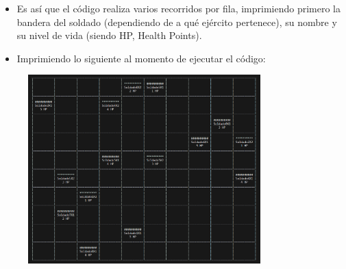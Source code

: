\documentclass{article}
\begin{document}
	\begin{itemize}
		\item Es así que el código realiza varios recorridos por fila, imprimiendo primero la bandera del soldado (dependiendo de a qué ejército pertenece), su nombre y su nivel de vida (siendo HP, Health Points).
		\item Imprimiendo lo siguiente al momento de ejecutar el código:
	\end{itemize}
	
	\begin{figure}[H]
		\centering
	\includegraphics[width=0.8\textwidth,keepaspectratio]{img/captura1.png}
	\end{figure}
	
\end{document}
